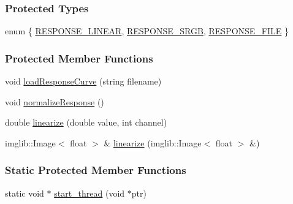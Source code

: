 \subsubsection*{\-Protected \-Types}
\begin{DoxyCompactItemize}
\item 
enum \{ \hyperlink{classSource_af23502cf09ec17790808c30d6a3bca74a9710d90a77764c4d2611decfe6ebe4c8}{\-R\-E\-S\-P\-O\-N\-S\-E\-\_\-\-L\-I\-N\-E\-A\-R}, 
\hyperlink{classSource_af23502cf09ec17790808c30d6a3bca74adef7a29570e1ca10883106b596074f4f}{\-R\-E\-S\-P\-O\-N\-S\-E\-\_\-\-S\-R\-G\-B}, 
\hyperlink{classSource_af23502cf09ec17790808c30d6a3bca74acaa89d52dfe2ddb82eded218d03cb2de}{\-R\-E\-S\-P\-O\-N\-S\-E\-\_\-\-F\-I\-L\-E}
 \}
\end{DoxyCompactItemize}
\subsubsection*{\-Protected \-Member \-Functions}
\begin{DoxyCompactItemize}
\item 
void \hyperlink{classSource_ad2d73e4aaeca3f7c60858ecf165e00ab}{load\-Response\-Curve} (string filename)
\item 
void \hyperlink{classSource_aadcf801d1046197fc00144655ddf2732}{normalize\-Response} ()
\item 
double \hyperlink{classSource_a81708a4890a1077a02091ba4260262e8}{linearize} (double value, int channel)
\item 
imglib\-::\-Image$<$ float $>$ \& \hyperlink{classSource_a754e6d21c1afcde0292fc8648bd3934a}{linearize} (imglib\-::\-Image$<$ float $>$ \&)
\end{DoxyCompactItemize}
\subsubsection*{\-Static \-Protected \-Member \-Functions}
\begin{DoxyCompactItemize}
\item 
static void $\ast$ \hyperlink{classSource_a65c60f259db311b04c5d411507c6e175}{start\-\_\-thread} (void $\ast$ptr)
\end{DoxyCompactItemize}

